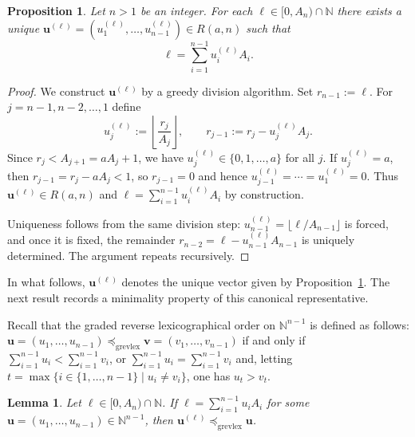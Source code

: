 \documentclass[12pt,a4paper]{amsart}
\newtheorem{lemma}[theorem]{Lemma}
\newtheorem{proposition}[theorem]{Proposition}
\theoremstyle{definition}
\begin{document}
\begin{proposition}\label{prop:canonical}
Let $n>1$ be an integer. For each $\ell\in[0,A_n)\cap\mathbb{N}$ there exists a unique
$\mathbf{u}^{(\ell)}=(u^{(\ell)}_1,\ldots,u^{(\ell)}_{n-1})\in R(a,n)$ such that
\[
\ell=\sum_{i=1}^{n-1}u^{(\ell)}_iA_i.
\]
\end{proposition}

\begin{proof}
We construct $\mathbf{u}^{(\ell)}$ by a greedy division algorithm.
Set $r_{n-1}:=\ell$. For $j=n-1,n-2,\ldots,1$ define
\[
u^{(\ell)}_j:=\left\lfloor \frac{r_j}{A_j}\right\rfloor,
\qquad
r_{j-1}:=r_j-u^{(\ell)}_jA_j.
\]
Since $r_j<A_{j+1}=aA_j+1$, we have $u^{(\ell)}_j\in\{0,1,\ldots,a\}$ for all $j$. If $u^{(\ell)}_j=a$, then $r_{j-1}=r_j-aA_j<1$, so $r_{j-1}=0$ and hence $u^{(\ell)}_{j-1}=\cdots=u^{(\ell)}_1=0$. Thus $\mathbf{u}^{(\ell)}\in R(a,n)$ and $\ell=\sum_{i=1}^{n-1}u^{(\ell)}_iA_i$ by construction.

Uniqueness follows from the same division step: $u^{(\ell)}_{n-1}=\lfloor \ell/A_{n-1}\rfloor$ is forced, and once it is fixed, the remainder $r_{n-2}=\ell-u^{(\ell)}_{n-1}A_{n-1}$ is uniquely determined. The argument repeats recursively.
\end{proof}

In what follows, $\mathbf{u}^{(\ell)}$ denotes the unique vector given by
Proposition~\ref{prop:canonical}. The next result records a minimality property
of this canonical representative.

Recall that the graded reverse lexicographical order on $\mathbb{N}^{n-1}$ is defined as follows: $\mathbf{u}=(u_1,\ldots,u_{n-1}) \preceq_{\mathrm{grevlex}} \mathbf{v}=(v_1,\ldots,v_{n-1})$ if and only if $\sum_{i=1}^{n-1}u_i<\sum_{i=1}^{n-1}v_i$, or $\sum_{i=1}^{n-1}u_i=\sum_{i=1}^{n-1}v_i$ and, letting $t=\max\{i\in\{1,\ldots,n-1\}\mid u_i\neq v_i\}$, one has $u_t>v_t$.

\begin{lemma}\label{lem:grevlex}
Let $\ell\in[0,A_n)\cap\mathbb{N}$. If
$\ell=\sum_{i=1}^{n-1}u_iA_i$ for some
$\mathbf{u}=(u_1,\ldots,u_{n-1})\in\mathbb{N}^{n-1}$, then
$\mathbf{u}^{(\ell)}\preceq_{\mathrm{grevlex}}\mathbf{u}$.
\end{lemma}
\end{document}
